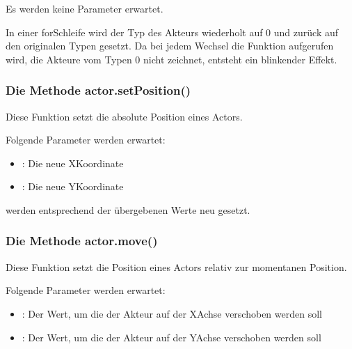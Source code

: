 \documentclass[letterpaper,10pt,ngerman]{sphinxmanual}
\begin{document}

Es werden keine Parameter erwartet.


In einer for\sphinxhyphen{}Schleife wird der Typ des Akteurs wiederholt auf 0 und zurück auf
den originalen Typen gesetzt. Da bei jedem Wechsel die  Funktion
aufgerufen wird, die Akteure vom Typen 0 nicht zeichnet, entsteht ein
blinkender Effekt.


\subsubsection{Die Methode actor.setPosition()}
\label{\detokenize{programming:die-methode-actor-setposition}}
Diese Funktion setzt die absolute Position eines Actors.


Folgende Parameter werden erwartet:
\begin{itemize}
\item {} 
: Die neue X\sphinxhyphen{}Koordinate

\item {} 
: Die neue Y\sphinxhyphen{}Koordinate

\end{itemize}


 werden entsprechend der übergebenen Werte neu
gesetzt.


\subsubsection{Die Methode actor.move()}
\label{\detokenize{programming:die-methode-actor-move}}
Diese Funktion setzt die Position eines Actors relativ zur momentanen Position.


Folgende Parameter werden erwartet:
\begin{itemize}
\item {} 
: Der Wert, um die der Akteur auf der X\sphinxhyphen{}Achse verschoben
werden soll

\item {} 
: Der Wert, um die der Akteur auf der Y\sphinxhyphen{}Achse verschoben
werden soll

\end{itemize}
\end{document}
